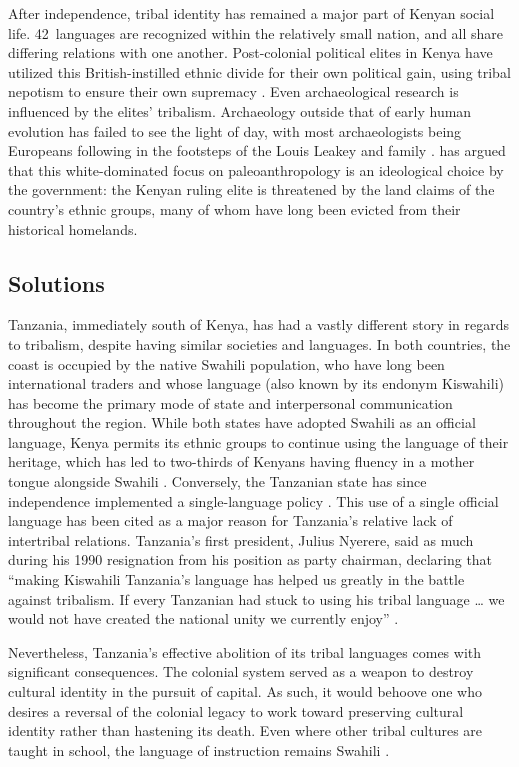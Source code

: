 \documentclass[american]{../../../coursework}
\begin{document}
After independence, tribal identity has remained a major part of Kenyan social
life. 42~languages are recognized within the relatively small nation, and all
share differing relations with one another. Post-colonial political elites in
Kenya have utilized this British-instilled ethnic divide for their own
political gain, using tribal nepotism to ensure their own supremacy
\parencite{Orvis2001}. Even archaeological research is influenced by the
elites' tribalism. Archaeology outside that of early human evolution has
failed to see the light of day, with most archaeologists being Europeans
following in the footsteps of the Louis Leakey and family \parencite{Koff1997}.
\textcite{Schmidt1995} has argued that this white-dominated focus on
paleoanthropology is an ideological choice by the government: the Kenyan
ruling elite is threatened by the land claims of the country's ethnic groups,
many of whom have long been evicted from their historical homelands.

\subsection{Solutions}

Tanzania, immediately south of Kenya, has had a vastly different story in
regards to tribalism, despite having similar societies and languages. In both
countries, the coast is occupied by the native Swahili population, who have
long been international traders and whose language (also known by its endonym
Kiswahili) has become the primary mode of state and interpersonal
communication throughout the region. While both states have adopted Swahili as
an official language, Kenya permits its ethnic groups to continue using the
language of their heritage, which has led to two-thirds of Kenyans having
fluency in a mother tongue alongside Swahili \parencite{Githiora2008}.
Conversely, the Tanzanian state has since independence implemented a
single-language policy \parencite{Topan2008}. This use of a single official
language has been cited as a major reason for Tanzania's relative lack of
intertribal relations. Tanzania's first president, Julius Nyerere, said as
much during his 1990 resignation from his position as party chairman,
declaring that ``making Kiswahili Tanzania's language has helped us greatly in
the battle against tribalism. If every Tanzanian had stuck to using his tribal
language … we would not have created the national unity we currently enjoy''
\parencites{Nyerere1990}[cited in][]{Topan2008}.

Nevertheless, Tanzania's effective abolition of its tribal languages comes
with significant consequences. The colonial system served as a weapon to
destroy cultural identity in the pursuit of capital. As such, it would behoove
one who desires a reversal of the colonial legacy to work toward preserving
cultural identity rather than hastening its death. Even where other tribal
cultures are taught in school, the language of instruction remains Swahili
\parencite{Topan2008}.
\end{document}
